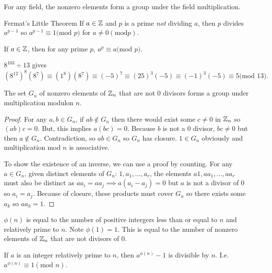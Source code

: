 \begin{remark}
    For any field, the nonzero elements form a group under the field multiplication.
\end{remark}
\begin{theorem}{Fermat's Little Theorem}
    If $a \in \mathbb{Z}$ and $p$ is a prime \emph{not} dividing $a$, then $p$ divides $a^{p-1}$ so $a^{p-1} \equiv 1 \text{(mod $p$)}$ for $a \neq 0 (\text{mod} p)$.
\end{theorem}
\begin{corollary}
    If $a \in \mathbb{Z}$, then for any prime $p$, $a^p \equiv a \text{(mod $p$)}.$
\end{corollary}
\begin{example}
    $8^{103} \div 13$ gives $(8^{12})^8(8^7) \equiv (1^8)(8^7) \equiv (-5)^7 \equiv (25)^3(-5) \equiv (-1)^3(-5) \equiv 5 \text{(mod 13)}.$
\end{example}
\begin{theorem}
    The set $G_n$ of nonzero elements of $\mathbb{Z}_n$ that are not 0 divisors forms a group under multiplication modulon $n$.
\end{theorem}
\begin{proof}
    For any $a, b \in G_n$, if $ab \notin G_n$ then there would exist some $c \neq 0$ in $\mathbb{Z}_n$ so $(ab)c = 0$. But, this implies $a(bc) = 0$. Because $b$ is not a 0 divisor, $bc \neq 0$ but then $a \notin G_n$. Contradiction, so $ab \in G_n$ so $G_n$ has closure. $1 \in G_n$ obviously and multiplication mod $n$ is associative.

    To show the existence of an inverse, we can use a proof by counting. For any $a \in G_n$, given distinct elements of $G_n$: $1, a_1, \ldots, a_r$, the elements $a1, aa_1, \ldots, aa_r$ must also be distinct as $aa_i = aa_j \implies a(a_i - a_j) = 0$ but $a$ is not a divisor of 0 so $a_i = a_j$. Because of closure, these products must cover $G_n$ so there exists some $a_k$ so $aa_k = 1$.
\end{proof}
\begin{remark}
    $\phi(n)$ is equal to the number of positive intergers less than or equal to $n$ and relatively prime to $n$. Note $\phi(1) = 1$. This is equal to the number of nonzero elements of $\mathbb{Z}_n$ that are not divisors of 0.
\end{remark}
\begin{theorem}
    If $a$ is an integer relatively prime to $n$, then $a^{\phi(n)}-1$ is divisible by $n$. I.e. $a^{\phi(n)} \equiv 1 (\text{mod } n)$.
\end{theorem}
